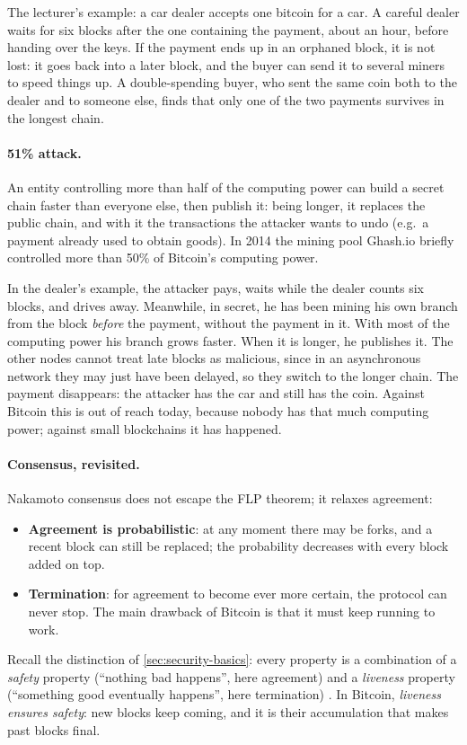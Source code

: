 The lecturer's example: a car dealer accepts one bitcoin for a car. A careful dealer waits for six blocks after the one containing the payment, about an hour, before handing over the keys. If the payment ends up in an orphaned block, it is not lost: it goes back into a later block, and the buyer can send it to several miners to speed things up. A double-spending buyer, who sent the same coin both to the dealer and to someone else, finds that only one of the two payments survives in the longest chain.

\paragraph{51\% attack.} An entity controlling more than half of the computing power can build a secret chain faster than everyone else, then publish it: being longer, it replaces the public chain, and with it the transactions the attacker wants to undo (e.g.\ a payment already used to obtain goods). In 2014 the mining pool Ghash.io briefly controlled more than 50\% of Bitcoin's computing power.

In the dealer's example, the attacker pays, waits while the dealer counts six blocks, and drives away. Meanwhile, in secret, he has been mining his own branch from the block \emph{before} the payment, without the payment in it. With most of the computing power his branch grows faster. When it is longer, he publishes it. The other nodes cannot treat late blocks as malicious, since in an asynchronous network they may just have been delayed, so they switch to the longer chain. The payment disappears: the attacker has the car and still has the coin. Against Bitcoin this is out of reach today, because nobody has that much computing power; against small blockchains it has happened.

\paragraph{Consensus, revisited.} Nakamoto consensus does not escape the FLP theorem; it relaxes agreement:
\begin{itemize}
    \item \textbf{Agreement is probabilistic}: at any moment there may be forks, and a recent block can still be replaced; the probability decreases with every block added on top.
    \item \textbf{Termination}: for agreement to become ever more certain, the protocol can never stop. The main drawback of Bitcoin is that it must keep running to work.
\end{itemize}
Recall the distinction of \cref{sec:security-basics}: every property is a combination of a \emph{safety} property (\enquote{nothing bad happens}, here agreement) and a \emph{liveness} property (\enquote{something good eventually happens}, here termination) \cite{alpern1985}. In Bitcoin, \emph{liveness ensures safety}: new blocks keep coming, and it is their accumulation that makes past blocks final.

